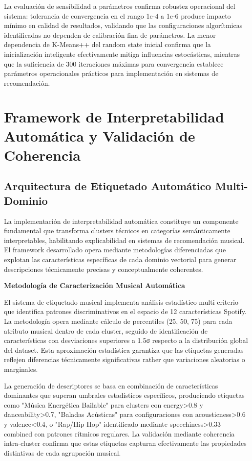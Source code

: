 \documentclass[12pt,a4paper]{report}
\begin{document}
La evaluación de sensibilidad a parámetros confirma robustez operacional del sistema: tolerancia de convergencia en el rango 1e-4 a 1e-6 produce impacto mínimo en calidad de resultados, validando que las configuraciones algorítmicas identificadas no dependen de calibración fina de parámetros. La menor dependencia de K-Means++ del random state inicial confirma que la inicialización inteligente efectivamente mitiga influencias estocásticas, mientras que la suficiencia de 300 iteraciones máximas para convergencia establece parámetros operacionales prácticos para implementación en sistemas de recomendación.

\section{Framework de Interpretabilidad Automática y Validación de Coherencia}

\subsection{Arquitectura de Etiquetado Automático Multi-Dominio}

La implementación de interpretabilidad automática constituye un componente fundamental que transforma clusters técnicos en categorías semánticamente interpretables, habilitando explicabilidad en sistemas de recomendación musical. El framework desarrollado opera mediante metodologías diferenciadas que explotan las características específicas de cada dominio vectorial para generar descripciones técnicamente precisas y conceptualmente coherentes.

\textbf{Metodología de Caracterización Musical Automática}

El sistema de etiquetado musical implementa análisis estadístico multi-criterio que identifica patrones discriminativos en el espacio de 12 características Spotify. La metodología opera mediante cálculo de percentiles (25, 50, 75) para cada atributo musical dentro de cada cluster, seguido de identificación de características con desviaciones superiores a 1.5σ respecto a la distribución global del dataset. Esta aproximación estadística garantiza que las etiquetas generadas reflejen diferencias técnicamente significativas rather que variaciones aleatorias o marginales.

La generación de descriptores se basa en combinación de características dominantes que superan umbrales estadísticos específicos, produciendo etiquetas como "Música Energética Bailable" para clusters con energy>0.8 y danceability>0.7, "Baladas Acústicas" para configuraciones con acousticness>0.6 y valence<0.4, o "Rap/Hip-Hop" identificado mediante speechiness>0.33 combined con patrones rítmicos regulares. La validación mediante coherencia intra-cluster confirma que estas etiquetas capturan efectivamente las propiedades distintivas de cada agrupación musical.
\end{document}
